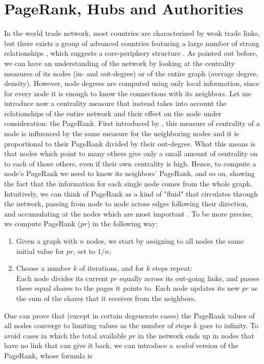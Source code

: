 \pagebreak
\section{PageRank, Hubs and Authorities}

In the world trade network, most countries are characterized by weak trade links, but there exists a group of advanced countries featuring a large number of strong relationships \cite{deguchi2014hubs}, which suggests a core-periphery structure \cite{fagiolo2010evolution}. As pointed out before, we can have an understanding of the network by looking at the centrality measures of its nodes (in- and out-degree) or of the entire graph (average degree, density). However, node degrees are computed using only local information, since for every node it is enough to know the connections with its neighbors. Let me introduce now a centrality measure that instead takes into account the relationships of the entire network and their effect on the node under consideration: the PageRank. 
First introduced by \textcite{page1999pagerank}, this measure of centrality of a node is influenced by the same measure for the neighboring nodes and it is proportional to their PageRank divided by their out-degree. What this means is that nodes which point to many others give only a small amount of centrality on to each of those others, even if their own centrality is high. Hence, to compute a node's PageRank we need to know its neighbors' PageRank, and so on, showing the fact that the information for each single node comes from the whole graph. Intuitively, we can think of PageRank as a kind of "fluid" that circulates through the network, passing from node to node across edges following their direction, and accumulating at the nodes which are most important \cite{easley2012networks}. To be more precise, we compute PageRank ($pr$) in the following way:
\begin{enumerate}
    \item Given a graph with $n$ nodes, we start by assigning to all nodes the same initial value for $pr$, set to $1/n$;
    \item Choose a number $k$ of iterations, and for $k$ steps repeat:\\
            Each node divides its current $pr$ equally across its out-going links, and passes these equal shares to the pages it points to. Each node updates its new $pr$ as the sum of the shares that it receives from the neighbors.
\end{enumerate}
One can prove that (except in certain degenerate cases) the PageRank values of all nodes converge to limiting values as the number of steps $k$ goes to infinity. To avoid cases in which the total available $pr$ in the network ends up in nodes that have no link that can give it back, we can introduce a \textit{scaled} version of the PageRank, whose formula is
